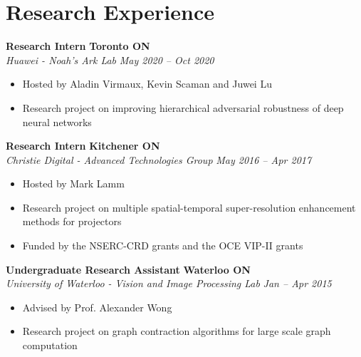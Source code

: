 \section*{Research Experience}
    \vspace{\postsubhead}
      \textbf{Research Intern}
      \hfill
      \textbf{Toronto ON}\\
      \textit{Huawei - Noah's Ark Lab}
      \hfill
      \textit{May 2020 -- Oct 2020}
      \begin{itemize}
        \setlength\itemsep{0.2em}
        \item Hosted by Aladin Virmaux, Kevin Scaman and Juwei Lu
        \item Research project on improving hierarchical adversarial robustness of deep neural networks 
      \end{itemize}
      \vspace{\interlist}
      \textbf{Research Intern}
      \hfill
      \textbf{Kitchener ON}\\
      \textit{Christie Digital - Advanced Technologies Group}
      \hfill
      \textit{May 2016 -- Apr 2017}
      \begin{itemize}
        \setlength\itemsep{0.2em}
        \item Hosted by Mark Lamm
        \item Research project on multiple spatial-temporal super-resolution enhancement methods for projectors
        \item Funded by the NSERC-CRD grants and the OCE VIP-II grants
      \end{itemize}
      \vspace{\interlist}
      \textbf{Undergraduate Research Assistant}
      \hfill
      \textbf{Waterloo ON}\\
      \textit{University of Waterloo - Vision and Image Processing Lab}
      \hfill
      \textit{Jan -- Apr 2015}
      \begin{itemize}
        \setlength\itemsep{0.2em}
        \item Advised by Prof. Alexander Wong
        \item Research project on graph contraction algorithms for large scale graph computation
      \end{itemize}
